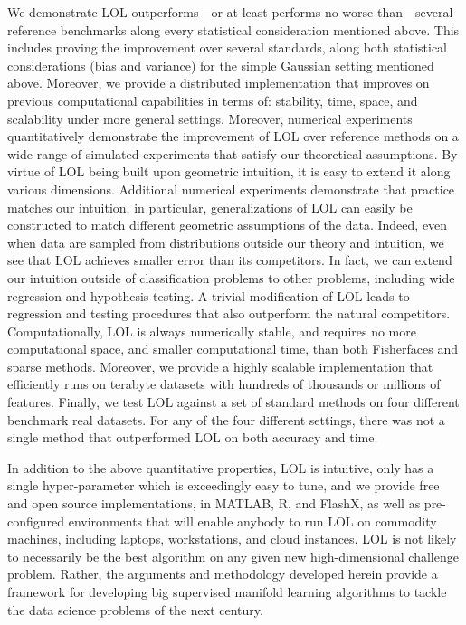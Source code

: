\documentclass[10pt]{article}
\begin{document}
We demonstrate LOL outperforms---or at least performs no worse than---several reference benchmarks along every statistical consideration mentioned above.  This includes proving the improvement over several standards, along both statistical considerations (bias and variance) for the simple Gaussian setting mentioned above. Moreover, we provide a distributed implementation that improves on previous computational capabilities in terms of: stability, time, space, and scalability under more general settings.  Moreover, numerical experiments quantitatively demonstrate the improvement of LOL over reference methods on a wide range of simulated experiments that satisfy our theoretical assumptions. By virtue of LOL being built upon geometric intuition, it is easy to extend it along various dimensions.  Additional numerical experiments demonstrate that practice matches our intuition, in particular, generalizations of LOL can easily be constructed to match different geometric assumptions of the data.  Indeed, even when data are sampled from distributions outside our theory and intuition, we see that LOL achieves smaller error than its competitors. In fact, we can extend our intuition outside of classification problems to other problems, including wide regression and hypothesis testing.  A trivial modification of LOL leads to regression and testing procedures that also outperform the natural competitors.  Computationally, LOL is always numerically stable, and requires no more computational space, and smaller computational time, than both Fisherfaces and sparse methods.  Moreover, we provide a highly scalable implementation that efficiently runs on terabyte datasets with hundreds of thousands or millions of features. Finally, we test LOL against a set of standard methods on four different benchmark real datasets.  For any of the four different settings, there was not a single method that outperformed LOL on both accuracy and time.   

In addition to the above quantitative properties, LOL is intuitive, only has a single hyper-parameter which is exceedingly easy to tune, and we provide free and open source implementations, in MATLAB, R, and FlashX, as well as pre-configured environments that will enable anybody to run LOL on commodity machines, including laptops, workstations, and cloud instances.  LOL is not likely to necessarily be the best algorithm on any given new high-dimensional challenge problem.  Rather, the arguments and methodology developed herein provide a framework for developing big supervised manifold learning algorithms to tackle the data science problems of the next century.
\end{document}
